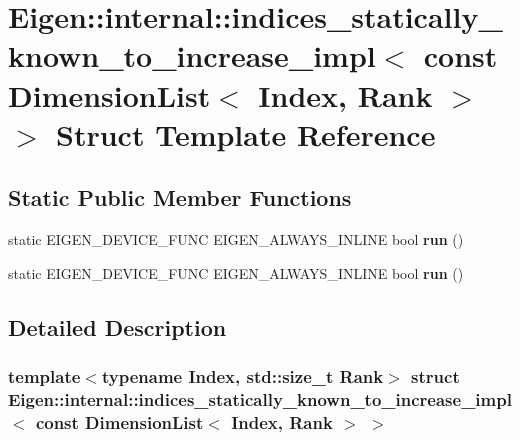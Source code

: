 \hypertarget{struct_eigen_1_1internal_1_1indices__statically__known__to__increase__impl_3_01const_01_dimensio6db8c53663683fc03a6211a2a9a1ff02}{}\section{Eigen\+:\+:internal\+:\+:indices\+\_\+statically\+\_\+known\+\_\+to\+\_\+increase\+\_\+impl$<$ const Dimension\+List$<$ Index, Rank $>$ $>$ Struct Template Reference}
\label{struct_eigen_1_1internal_1_1indices__statically__known__to__increase__impl_3_01const_01_dimensio6db8c53663683fc03a6211a2a9a1ff02}
\subsection*{Static Public Member Functions}
\begin{DoxyCompactItemize}
\item 
\mbox{\label{struct_eigen_1_1internal_1_1indices__statically__known__to__increase__impl_3_01const_01_dimensio6db8c53663683fc03a6211a2a9a1ff02_aa0bf4cd3ec680d9e1774bf409cf8b95e}} 
static E\+I\+G\+E\+N\+\_\+\+D\+E\+V\+I\+C\+E\+\_\+\+F\+U\+NC E\+I\+G\+E\+N\+\_\+\+A\+L\+W\+A\+Y\+S\+\_\+\+I\+N\+L\+I\+NE bool {\bfseries run} ()
\item 
\mbox{\label{struct_eigen_1_1internal_1_1indices__statically__known__to__increase__impl_3_01const_01_dimensio6db8c53663683fc03a6211a2a9a1ff02_aa0bf4cd3ec680d9e1774bf409cf8b95e}} 
static E\+I\+G\+E\+N\+\_\+\+D\+E\+V\+I\+C\+E\+\_\+\+F\+U\+NC E\+I\+G\+E\+N\+\_\+\+A\+L\+W\+A\+Y\+S\+\_\+\+I\+N\+L\+I\+NE bool {\bfseries run} ()
\end{DoxyCompactItemize}


\subsection{Detailed Description}
\subsubsection*{template$<$typename Index, std\+::size\+\_\+t Rank$>$\newline
struct Eigen\+::internal\+::indices\+\_\+statically\+\_\+known\+\_\+to\+\_\+increase\+\_\+impl$<$ const Dimension\+List$<$ Index, Rank $>$ $>$}



